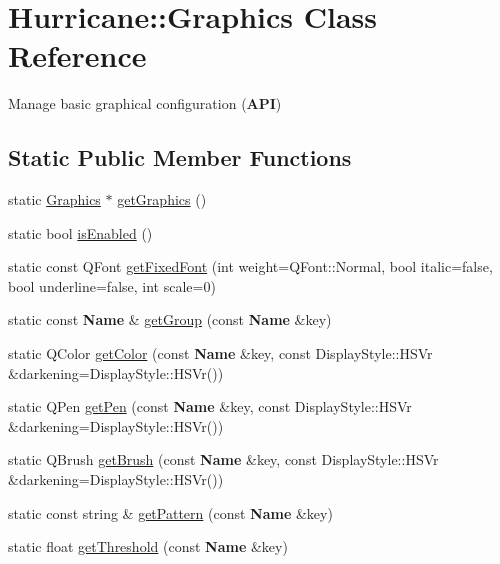 \hypertarget{classHurricane_1_1Graphics}{\section{Hurricane\-:\-:Graphics Class Reference}
\label{classHurricane_1_1Graphics}
}


Manage basic graphical configuration ({\bfseries A\-P\-I})  


\subsection*{Static Public Member Functions}
\begin{DoxyCompactItemize}
\item 
static \hyperlink{classHurricane_1_1Graphics}{Graphics} $\ast$ \hyperlink{classHurricane_1_1Graphics_a4f8d6eaeef8d9ae781be929e95545f0c}{get\-Graphics} ()
\item 
static bool \hyperlink{classHurricane_1_1Graphics_a02964067103bdd4c27bbf4af91a47cf8}{is\-Enabled} ()
\item 
static const Q\-Font \hyperlink{classHurricane_1_1Graphics_a30322de9fd4a042d8773465c622a1650}{get\-Fixed\-Font} (int weight=Q\-Font\-::\-Normal, bool italic=false, bool underline=false, int scale=0)
\item 
static const {\bf Name} \& \hyperlink{classHurricane_1_1Graphics_a1262f31f53c2c36440e1e05fd2da17fc}{get\-Group} (const {\bf Name} \&key)
\item 
static Q\-Color \hyperlink{classHurricane_1_1Graphics_abaa552c464f1a664dc77cc0c0118c35c}{get\-Color} (const {\bf Name} \&key, const Display\-Style\-::\-H\-S\-Vr \&darkening=Display\-Style\-::\-H\-S\-Vr())
\item 
static Q\-Pen \hyperlink{classHurricane_1_1Graphics_a0197c915f8d76c3798cf19ea2d878834}{get\-Pen} (const {\bf Name} \&key, const Display\-Style\-::\-H\-S\-Vr \&darkening=Display\-Style\-::\-H\-S\-Vr())
\item 
static Q\-Brush \hyperlink{classHurricane_1_1Graphics_ad67a43df460d5c5d5179a81d2a72c9a9}{get\-Brush} (const {\bf Name} \&key, const Display\-Style\-::\-H\-S\-Vr \&darkening=Display\-Style\-::\-H\-S\-Vr())
\item 
static const string \& \hyperlink{classHurricane_1_1Graphics_a08111e942b095327fa6031dca7c96e8e}{get\-Pattern} (const {\bf Name} \&key)
\item 
static float \hyperlink{classHurricane_1_1Graphics_a2291edddc743edc44fdea26437f3095f}{get\-Threshold} (const {\bf Name} \&key)

\end{DoxyCompactItemize}
